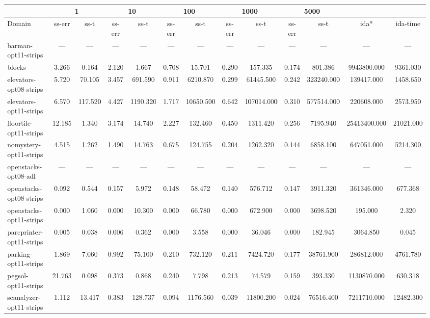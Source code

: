 \documentclass[a4paper,12pt]{article}
\begin{document}
\begin{table}[]
\begin{tabular}{l@{\hspace{2pt}} *{12}{c}}
                  & \multicolumn{2}{|c|}{1} & \multicolumn{2}{c|}{10} & \multicolumn{2}{c|}{100} & \multicolumn{2}{c|}{1000} & \multicolumn{2}{c|}{5000}                   \\ \hline
Domain                  & ss-err  & ss-t  & ss-err  & ss-t  & ss-err  & ss-t  & ss-err  & ss-t  & ss-err  & ss-t  & ida*  & ida-time  \\ \hline
barman-opt11-strips     & --- & --- & --- & --- & --- & --- & --- & --- & --- & --- & --- & --- \\ \hline
blocks                  & 3.266 & 0.164 & 2.120 & 1.667 & 0.708 & 15.701 & 0.290 & 157.335 & 0.174 & 801.386 & 9943800.000 & 9361.030 \\ \hline
elevators-opt08-strips  & 5.720 & 70.105 & 3.457 & 691.590 & 0.911 & 6210.870 & 0.299 & 61445.500 & 0.242 & 323240.000 & 139417.000 & 1458.650 \\ \hline
elevators-opt11-strips  & 6.570 & 117.520 & 4.427 & 1190.320 & 1.717 & 10650.500 & 0.642 & 107014.000 & 0.310 & 577514.000 & 220608.000 & 2573.950 \\ \hline
floortile-opt11-strips  & 12.185 & 1.340 & 3.174 & 14.740 & 2.227 & 132.460 & 0.450 & 1311.420 & 0.256 & 7195.940 & 25413400.000 & 21021.000 \\ \hline
nomystery-opt11-strips  & 4.515 & 1.262 & 1.490 & 14.763 & 0.675 & 124.755 & 0.204 & 1262.320 & 0.144 & 6858.100 & 647051.000 & 5214.300 \\ \hline
openstacks-opt08-adl    & --- & --- & --- & --- & --- & --- & --- & --- & --- & --- & --- & --- \\ \hline
openstacks-opt08-strips & 0.092 & 0.544 & 0.157 & 5.972 & 0.148 & 58.472 & 0.140 & 576.712 & 0.147 & 3911.320 & 361346.000 & 677.368 \\ \hline
openstacks-opt11-strips & 0.000 & 1.060 & 0.000 & 10.300 & 0.000 & 66.780 & 0.000 & 672.900 & 0.000 & 3698.520 & 195.000 & 2.320 \\ \hline
parcprinter-opt11-strips& 0.005 & 0.038 & 0.006 & 0.362 & 0.000 & 3.558 & 0.000 & 36.046 & 0.000 & 182.945 & 3064.850 & 0.045 \\ \hline
parking-opt11-strips    & 1.869 & 7.060 & 0.992 & 75.100 & 0.210 & 732.120 & 0.211 & 7424.720 & 0.177 & 38761.900 & 286812.000 & 4761.780 \\ \hline
pegsol-opt11-strips     & 21.763 & 0.098 & 0.373 & 0.868 & 0.240 & 7.798 & 0.213 & 74.579 & 0.159 & 393.330 & 1130870.000 & 630.318 \\ \hline
scanalyzer-opt11-strips & 1.112 & 13.417 & 0.383 & 128.737 & 0.094 & 1176.560 & 0.039 & 11800.200 & 0.024 & 76516.400 & 7211710.000 & 12482.300 \\ \hline

\end{tabular}
\end{table}
\end{document}

